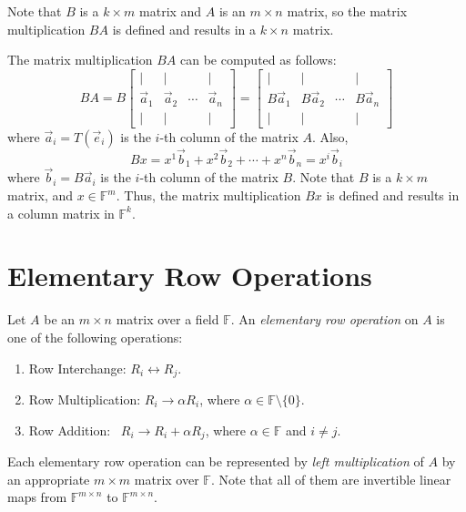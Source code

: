 \documentclass[
	11pt, %
	fleqn, %
	a4paper, %
]{LegrandOrangeBook}
\newcommand{\F}{\mathbb{F}} %
\begin{document}
\begin{remark}
    Note that $B$ is a $k \times m$ matrix and $A$ is an $m \times n$ matrix, so the matrix multiplication $BA$ is defined and results in a $k \times n$ matrix.
\end{remark}

The matrix multiplication $BA$ can be computed as follows:
\[
    BA = B\begin{bmatrix}
        | & | & & | \\
        \vec{a}_1 & \vec{a}_2 & \cdots & \vec{a}_n \\
        | & | & & |
    \end{bmatrix} = \begin{bmatrix}
        | & | & & | \\
        B\vec{a}_1 & B\vec{a}_2 & \cdots & B\vec{a}_n \\
        | & | & & |
    \end{bmatrix}
\]
where $\vec{a}_i = T(\vec{e}_i)$ is the $i$-th column of the matrix $A$. Also, 
\[
    Bx = x^1 \vec{b}_1 + x^2 \vec{b}_2 + \cdots + x^n \vec{b}_n = x^i \vec{b}_i
\]
where $\vec{b}_i = B\vec{a}_i$ is the $i$-th column of the matrix $B$. Note that $B$ is a $k \times m$ matrix, and $x \in \F^m$. Thus, the matrix multiplication $Bx$ is defined and results in a column matrix in $\F^k$.

\newpage

\section{Elementary Row Operations}

\begin{definition}
    Let $A$ be an $m \times n$ matrix over a field $\F$. An \emph{elementary row operation} on $A$ is one of the following operations:
    \begin{enumerate}
        \item Row Interchange: \qquad $R_i \leftrightarrow R_j$.
        \item Row Multiplication: \quad $R_i \to \alpha R_i$, where $\alpha \in \F \setminus \{0\}$.
        \item Row Addition: \qquad\quad\ $R_i \to R_i + \alpha R_j$, where $\alpha \in \F$ and $i \neq j$.
    \end{enumerate}
    Each elementary row operation can be represented by \emph{left multiplication} of $A$ by an appropriate $m \times m$ matrix over $\F$. Note that all of them are invertible linear maps from $\F^{m \times n}$ to $\F^{m \times n}$.
\end{definition}
\end{document}
